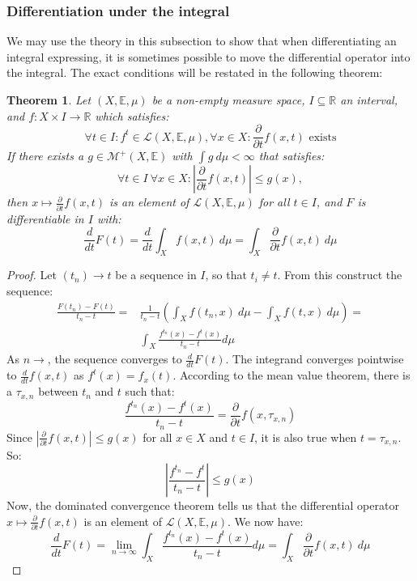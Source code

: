 \documentclass[12pt, a4paper]{article}
\newtheorem{theorem}{Theorem}[section]
\numberwithin{equation}{section}
\begin{document}
\subsubsection{Differentiation under the integral}
We may use the theory in this subsection to show that when differentiating an integral expressing, it is sometimes possible to move the differential operator into the integral. The exact conditions will be restated in the following theorem:

\begin{theorem}
Let $(X,\mathbb{E},\mu)$ be a non-empty measure space, $I\subseteq\mathbb{R}$ an interval, and $f: X\times I\rightarrow\mathbb{R}$ which satisfies:
\begin{equation}
\forall t\in I: f^t\in\mathcal{L}(X,\mathbb{E},\mu), \forall x\in X: \frac{\partial}{\partial t}f(x,t)\textrm{ exists}
\end{equation}
If there exists a $g\in\mathcal{M}^+(X,\mathbb{E})$ with $\int g\ d\mu<\infty$ that satisfies:
\begin{equation}
\forall t\in I\ \forall x\in X: \left|\frac{\partial}{\partial t}f(x,t)\right|\le g(x),
\end{equation}
then $x\mapsto\frac{\partial}{\partial t}f(x,t)$ is an element of $\mathcal{L}(X,\mathbb{E},\mu)$ for all $t\in I$, and $F$ is differentiable in $I$ with:
\begin{equation}
\frac{d}{dt}F(t)=\frac{d}{dt}\int_X f(x,t)\ d\mu=\int_X\frac{\partial}{\partial t}f(x,t)\ d\mu
\end{equation}
\end{theorem} 
\begin{proof}
Let $(t_n)\rightarrow t$ be a sequence in $I$, so that $t_i\neq t$. From this construct the sequence:
\begin{align}
\frac{F(t_n)-F(t)}{t_n-t}=&\frac{1}{t_n-t}\left(\int_X f(t_n,x)\ d\mu-\int_X f(t,x)\ d\mu\right)=\\
&\int_X\frac{f^{t_n}(x)-f^{t}(x)}{t_n-t}d\mu
\end{align}
As $n\rightarrow$, the sequence converges to $\frac{d}{dt}F(t)$. The integrand converges pointwise to $\frac{d}{dt}f(x,t)$ as $f^t(x)=f_x(t)$. According to the mean value theorem, there is a $\tau_{x,n}$ between $t_n$ and $t$ such that:
\begin{equation}
\frac{f^{t_n}(x)-f^{t}(x)}{t_n-t}=\frac{\partial}{\partial t}f(x,\tau_{x,n})
\end{equation}
Since $\left|\frac{\partial}{\partial t}f(x,t)\right|\le g(x)$ for all $x\in X$ and $t\in I$, it is also true when $t=\tau_{x,n}$. So:
\begin{equation}
\left|\frac{f^{t_n}-f^{t}}{t_n-t}\right|\le g(x)
\end{equation}
Now, the dominated convergence theorem tells us that the differential operator $x\mapsto\frac{\partial}{\partial t}f(x,t)$ is an element of $\mathcal{L}(X,\mathbb{E},\mu)$. We now have:
\begin{equation}
\frac{d}{dt}F(t)=\lim_{n\rightarrow\infty}\int_X\frac{f^{t_n}(x)-f^{t}(x)}{t_n-t}d\mu=\int_X\frac{\partial}{\partial t}f(x,t)\ d\mu
\end{equation}
\end{proof}
\end{document}
